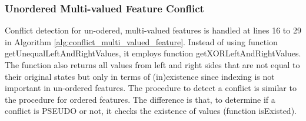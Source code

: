 
\subsubsection{Unordered Multi-valued Feature Conflict} 
\label{sec:unordered_conflict}
Conflict detection for un-odered, multi-valued features is handled at lines 16 to 29 in Algorithm \ref{alg:conflict_multi_valued_feature}. Instead of using function \textsf{getUnequalLeftAndRightValues}, it employs function \textsf{getXORLeftAndRightValues}. The function also returns all values from left and right sides that are not equal to their original states but only in terms of (in)existence since indexing is not important in un-ordered features. The procedure to detect a conflict is similar to the procedure for ordered features. The difference is that, to determine if a conflict is \textsf{PSEUDO} or not, it checks the existence of values (function \textsf{isExisted}).



